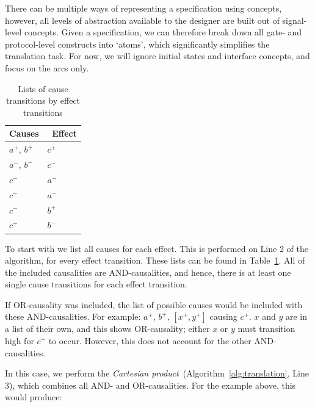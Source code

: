 \documentclass[british,conference,compsoc]{IEEEtran}
\begin{document}
\vspace{-1.5mm}

\noindent There can be multiple ways of representing a specification using concepts, 
however, all levels of abstraction available to the designer are built out of signal-level
concepts. Given a specification, we can therefore break down 
all gate- and protocol-level constructs into `atoms', which significantly 
simplifies the translation task. For now, we will ignore initial states and interface
concepts, and focus on the arcs only.

\begin{table}[h]
\vspace{-2mm}
\caption{Lists of cause transitions by effect transitions
		\label{tab:list-of-concepts}}
  \centering
\begin{tabular}[htb]{| m{2.7cm} | m{2.0cm} |}
  \hline
Causes & \, Effect \\ \hline \hline
$a^{+}$, $b^{+}$		& $c^{+}$ 	\\ \hline
$a^{-}$, $b^{-}$ 		& $c^{-}$ 	\\ \hline
$c^{-}$			& $a^{+}$ 	\\ \hline
$c^{+}$			& $a^{-}$ 	\\ \hline
$c^{-}$			& $b^{+}$ 	\\ \hline
$c^{+}$			& $b^{-}$ 	\\ \hline
  \end{tabular}
  \vspace{-3mm}
\end{table}

To start with we list all causes for each effect. This is performed on Line 2 of the algorithm, for every effect transition. 
These lists can be found in Table~\ref{tab:list-of-concepts}.
All of the included causalities are AND-causalities, and hence, there
is at least one single cause transitions for each effect transition. 

If OR-causality was included, the list of possible causes would be included with these
AND-causalities. For example:  $a^{+}$, $b^{+}$, $[x^{+}, y^{+}]$ causing
$c^{+}$. $x$ and $y$ are in a list of their own, and this shows OR-causality;
either $x$ or $y$ must transition high for $c^{+}$ to occur. However, this does
not account for the other AND-causalities. 

In this case, we perform the \emph{Cartesian product}~(Algorithm~\ref{alg:translation}, Line 3), which combines
all AND- and OR-causalities. For the example above, this would produce:
\end{document}
